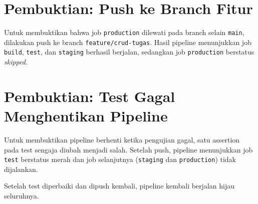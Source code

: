 \documentclass[a4paper,oneside,11pt]{book}
\begin{document}

\section{Pembuktian: Push ke Branch Fitur}

Untuk membuktikan bahwa job \texttt{production} dilewati pada branch selain \texttt{main}, dilakukan push ke branch \texttt{feature/crud-tugas}. Hasil pipeline menunjukkan job \texttt{build}, \texttt{test}, dan \texttt{staging} berhasil berjalan, sedangkan job \texttt{production} berstatus \textit{skipped}.


\section{Pembuktian: Test Gagal Menghentikan Pipeline}

Untuk membuktikan pipeline berhenti ketika pengujian gagal, satu assertion pada test sengaja diubah menjadi salah. Setelah push, pipeline menunjukkan job \texttt{test} berstatus merah dan job selanjutnya (\texttt{staging} dan \texttt{production}) tidak dijalankan.


Setelah test diperbaiki dan dipush kembali, pipeline kembali berjalan hijau seluruhnya.

\end{document}
